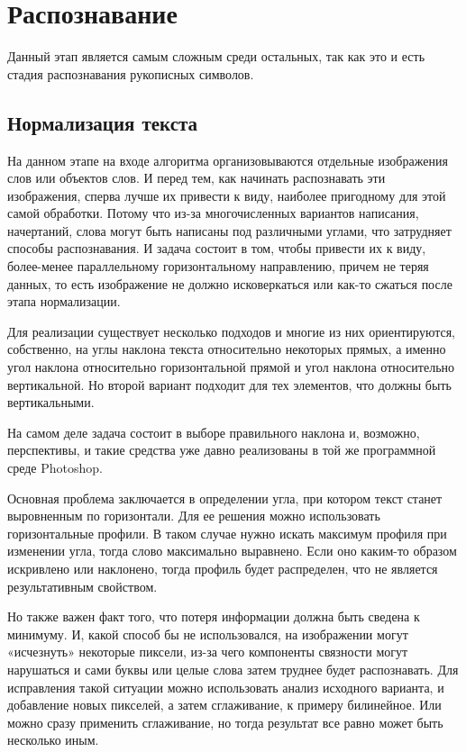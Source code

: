 \chapter{Распознавание} \label{ch3}


Данный этап является самым сложным среди остальных, так как это и есть стадия распознавания рукописных символов. 
	
\section{Нормализация текста} \label{ch3:sec1}

На данном этапе на входе алгоритма организовываются отдельные изображения слов или объектов слов. И перед тем, как начинать распознавать эти изображения, сперва лучше их привести к виду, наиболее пригодному для этой самой обработки. Потому что из-за многочисленных вариантов написания, начертаний, слова могут быть написаны под различными углами, что затрудняет способы распознавания. И задача состоит в том, чтобы привести их к виду, более-менее параллельному горизонтальному направлению, причем не теряя данных, то есть изображение не должно исковеркаться или как-то сжаться после этапа нормализации.

Для реализации существует несколько подходов и многие из них ориентируются, собственно, на углы наклона текста относительно некоторых прямых, а именно угол наклона относительно горизонтальной прямой и угол наклона относительно вертикальной. Но второй вариант подходит для тех элементов, что должны быть вертикальными.

На самом деле задача состоит в выборе правильного наклона и, возможно, перспективы, и такие средства уже давно реализованы в той же программной среде Photoshop.

Основная проблема заключается в определении угла, при котором текст станет выровненным по горизонтали. Для ее решения можно использовать горизонтальные профили. В таком случае нужно искать максимум профиля при изменении угла, тогда слово максимально выравнено. Если оно каким-то образом искривлено или наклонено, тогда профиль будет распределен, что не является результативным свойством.

Но также важен факт того, что потеря информации должна быть сведена к минимуму. И, какой способ бы не использовался, на изображении могут «исчезнуть» некоторые пиксели, из-за чего компоненты связности могут нарушаться и сами буквы или целые слова затем труднее будет распознавать. Для исправления такой ситуации можно использовать анализ исходного варианта, и добавление новых пикселей, а затем сглаживание, к примеру билинейное. Или можно сразу применить сглаживание, но тогда результат все равно может быть несколько иным.


